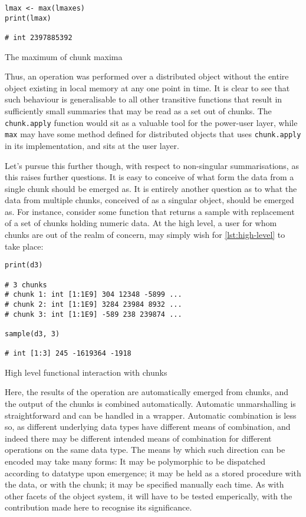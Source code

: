 \begin{listing}
    \begin{verbatim}
lmax <- max(lmaxes)
print(lmax)

# int 2397885392
    \end{verbatim}
    \caption{The maximum of chunk maxima}
    \label{lst:total-max}
\end{listing}

Thus, an operation was performed over a distributed object without the
entire object existing in local memory at any one point in time. It is
clear to see that such behaviour is generalisable to all other
transitive functions that result in sufficiently small summaries that
may be read as a set out of chunks. The \texttt{chunk.apply} function
would sit as a valuable tool for the power-user layer, while
\texttt{max} may have some method defined for distributed objects that
uses \texttt{chunk.apply} in its implementation, and sits at the user
layer.

Let's pursue this further though, with respect to non-singular
summarisations, as this raises further questions. It is easy to conceive
of what form the data from a single chunk should be emerged as. It is
entirely another question as to what the data from multiple chunks,
conceived of as a singular object, should be emerged as. For instance,
consider some function that returns a sample with replacement of a set
of chunks holding numeric data. At the high level, a user for whom
chunks are out of the realm of concern, may simply wish for \cref{lst:high-level} to take place:

\begin{listing}
    \begin{verbatim}
print(d3)

# 3 chunks
# chunk 1: int [1:1E9] 304 12348 -5899 ...
# chunk 2: int [1:1E9] 3284 23984 8932 ...
# chunk 3: int [1:1E9] -589 238 239874 ...

sample(d3, 3)

# int [1:3] 245 -1619364 -1918
    \end{verbatim}
    \caption{High level functional interaction with chunks}
    \label{lst:high-level}
\end{listing}

Here, the results of the operation are automatically emerged from
chunks, and the output of the chunks is combined automatically.
Automatic unmarshalling is straightforward and can be handled in a
wrapper. Automatic combination is less so, as different underlying data
types have different means of combination, and indeed there may be
different intended means of combination for different operations on the
same data type. The means by which such direction can be encoded may
take many forms: It may be polymorphic to be dispatched according to
datatype upon emergence; it may be held as a stored procedure with the
data, or with the chunk; it may be specified manually each time. As with
other facets of the object system, it will have to be tested
emperically, with the contribution made here to recognise its
significance.

